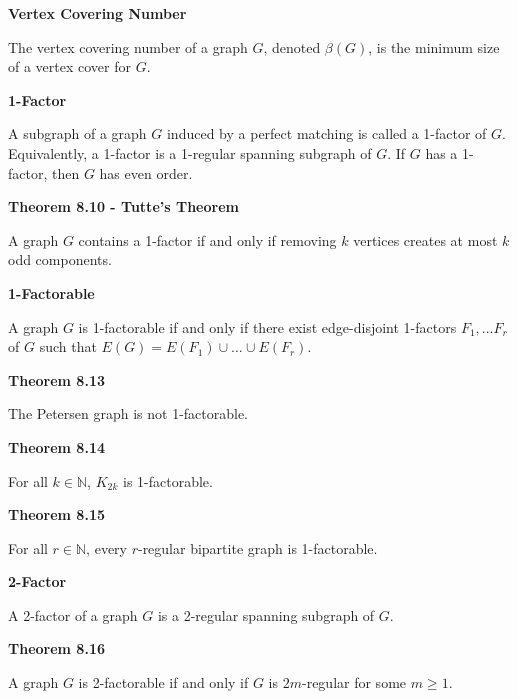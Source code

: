 \documentclass{article}
\begin{document}
\medskip\noindent\textbf{Vertex Covering Number}

	The vertex covering number of a graph $G$, denoted $\beta(G)$, is the minimum size of a vertex cover for $G$.

\medskip\noindent\textbf{1-Factor}

	A subgraph of a graph $G$ induced by a perfect matching is called a 1-factor of $G$.
	Equivalently, a 1-factor is a 1-regular spanning subgraph of $G$.
	If $G$ has a 1-factor, then $G$ has even order.

\medskip\noindent\textbf{Theorem 8.10 - Tutte's Theorem}

	A graph $G$ contains a 1-factor if and only if removing $k$ vertices creates at most $k$ odd components.

\medskip\noindent\textbf{1-Factorable}

    A graph $G$ is 1-factorable if and only if there exist edge-disjoint 1-factors $F_1, \hdots F_r$ of $G$ such that $E(G) = E(F_1) \cup \hdots \cup E(F_r)$.

\medskip\noindent\textbf{Theorem 8.13}

    The Petersen graph is not 1-factorable.

\medskip\noindent\textbf{Theorem 8.14}

    For all $k \in \mathbb N$, $K_{2k}$ is 1-factorable.

\medskip\noindent\textbf{Theorem 8.15}
    
    For all $r \in \mathbb N$, every $r$-regular bipartite graph is 1-factorable.

\medskip\noindent\textbf{2-Factor}

    A 2-factor of a graph $G$ is a 2-regular spanning subgraph of $G$.

\medskip\noindent\textbf{Theorem 8.16}

    A graph $G$ is 2-factorable if and only if $G$ is $2m$-regular for some $m \geq 1$.
\end{document}
